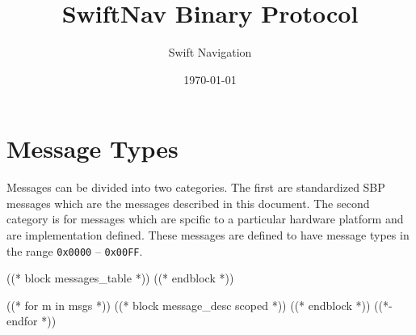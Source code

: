 \documentclass{article}
\title{SwiftNav Binary Protocol}
\author{Swift Navigation}
\date{\today}
\numberwithin{table}{subsection}
\numberwithin{field}{subsection}
\begin{document}
\maketitle

\thispagestyle{firstpage}

\section{Message Types}
\label{sec:Messages}

Messages can be divided into two categories. The first are standardized SBP
messages which are the messages described in this document. The second category
is for messages which are spcific to a particular hardware platform and are
implementation defined. These messages are defined to have message types in the
range \texttt{0x0000} -- \texttt{0x00FF}.

((* block messages_table *))
((* endblock *))


((* for m in msgs *))
((* block message_desc scoped *))
((* endblock *))
((*- endfor *))
\end{document}
